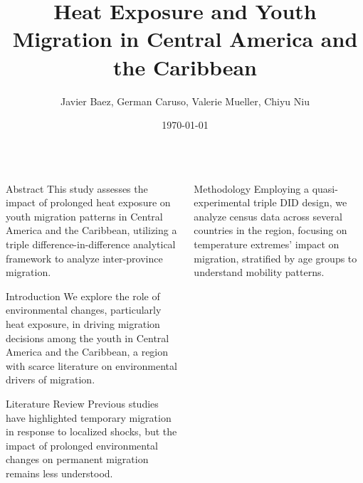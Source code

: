 \documentclass[final]{beamer}
\title{\Huge Heat Exposure and Youth Migration in Central America and the Caribbean}
\author{\Large Javier Baez, German Caruso, Valerie Mueller, Chiyu Niu}
\institute{\Large World Bank, International Food Policy Research Institute, University of Illinois}
\date{\Large\today}
\begin{document}
\begin{frame}[t]

\begin{block}{}
\centering
\maketitle
\end{block}

\begin{columns}[T]

\begin{column}{.32\textwidth}
    \begin{block}{\Huge Abstract}
    \Large
    This study assesses the impact of prolonged heat exposure on youth migration patterns in Central America and the Caribbean, utilizing a triple difference-in-difference analytical framework to analyze inter-province migration.
    \end{block}

    \vspace{1cm}

    \begin{block}{\Huge Introduction}
    \Large
    We explore the role of environmental changes, particularly heat exposure, in driving migration decisions among the youth in Central America and the Caribbean, a region with scarce literature on environmental drivers of migration.
    \end{block}

    \vspace{1cm}

    \begin{block}{\Huge Literature Review}
    \Large
    Previous studies have highlighted temporary migration in response to localized shocks, but the impact of prolonged environmental changes on permanent migration remains less understood.
    \end{block}
\end{column}

\begin{column}{.32\textwidth}
    \begin{block}{\Huge Methodology}
    \Large
    Employing a quasi-experimental triple DID design, we analyze census data across several countries in the region, focusing on temperature extremes' impact on migration, stratified by age groups to understand mobility patterns.
    \end{block}

    \vspace{1cm}


\end{column}
\end{columns}
\end{frame}
\end{document}
